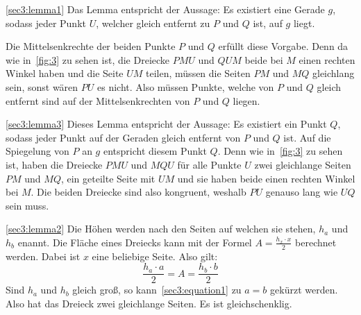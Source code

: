 \documentclass[10pt, a4paper]{amsart}
\makeatletter
\renewcommand\proofname{Beweis}
\renewenvironment{proof}[1][\proofname]{\par
\pushQED{\qed}%
\normalfont \topsep6\p@\@plus6\p@\relax
\trivlist
\item\relax
{\bfseries#1}\hspace\labelsep\ignorespaces
}{%
\popQED\endtrivlist\@endpefalse
}
\newenvironment{proof_thm}[1]{
\begin{proof}[\proofname~(#1)]}{\end{proof}}
\makeatother
\begin{document}
\begin{proof_thm}{\autoref{sec3:lemma1}}
  Das Lemma entspricht der Aussage: Es existiert eine Gerade $g$, sodass jeder
  Punkt $U$, welcher gleich entfernt zu $P$ und $Q$ ist, auf $g$ liegt.
  \begin{figure}[h]
    \centering
    \caption{}
    \label{fig:3}
  \end{figure}

  Die Mittelsenkrechte der beiden Punkte $P$ und $Q$ erfüllt diese Vorgabe. Denn
  da wie in~\autoref{fig:3} zu sehen ist, die
  Dreiecke $PMU$ und $QUM$ beide bei $M$ einen rechten Winkel haben und die
  Seite $UM$ teilen, müssen die Seiten $PM$ und $MQ$ gleichlang sein, sonst
  wären $PU$ es nicht. Also müssen Punkte, welche von $P$ und $Q$ gleich entfernt
  sind auf der Mittelsenkrechten von $P$ und $Q$ liegen.
\end{proof_thm}
\begin{proof_thm}{\autoref{sec3:lemma3}}
  Dieses Lemma entspricht der Aussage: Es existiert ein Punkt $Q$, sodass jeder
  Punkt auf der Geraden gleich entfernt von $P$ und $Q$ ist.
  Auf die Spiegelung von $P$ an $g$ entspricht diesem Punkt $Q$. Denn wie
  in~\autoref{fig:3} zu sehen ist, haben die Dreiecke $PMU$ und $MQU$ für alle
  Punkte $U$ zwei gleichlange Seiten $PM$ und $MQ$, ein geteilte Seite mit $UM$
  und sie haben beide einen rechten Winkel bei $M$. Die beiden Dreiecke sind
  also kongruent, weshalb $PU$ genauso lang wie $UQ$ sein muss.
\end{proof_thm}
\begin{proof_thm}{\autoref{sec3:lemma2}}
  Die Höhen werden nach den Seiten auf welchen sie stehen, $h_a$ und $h_b$
  enannt. Die Fläche eines Dreiecks kann mit der Formel $A=\frac{h_x\cdot x}{2}$
  berechnet werden. Dabei ist $x$ eine beliebige Seite. Also gilt:
  \begin{equation}\label{sec3:equation1}
    \dfrac{h_a\cdot a}{2}=A=\dfrac{h_b\cdot b}{2}
  \end{equation}
  Sind $h_a$ und $h_b$ gleich groß, so kann~\eqref{sec3:equation1} zu $a=b$
  gekürzt werden. Also hat das Dreieck zwei gleichlange Seiten. Es ist
  gleichschenklig.
\end{proof_thm}
\end{document}
